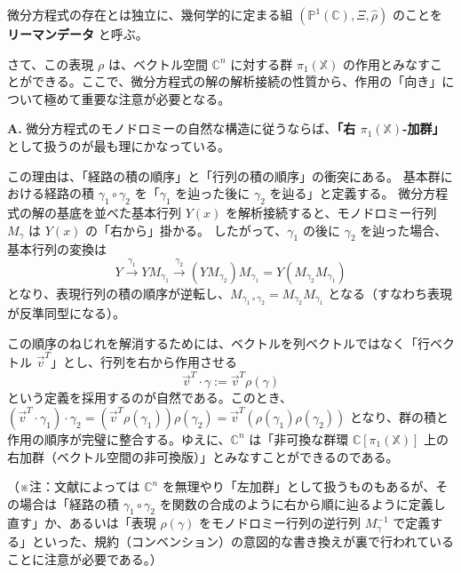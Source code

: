 \begin{definition}[リーマンデータの純粋化]
    微分方程式の存在とは独立に、幾何学的に定まる組 $(\mathbb{P}^{1}(\mathbb{C}),\Xi,\hat{\rho})$ のことを \textbf{リーマンデータ} と呼ぶ。
\end{definition}

さて、この表現 $\rho$ は、ベクトル空間 $\mathbb{C}^n$ に対する群 $\pi_1(\mathbb{X})$ の作用とみなすことができる。ここで、微分方程式の解の解析接続の性質から、作用の「向き」について極めて重要な注意が必要となる。

\begin{Q}
\textbf{A.} 微分方程式のモノドロミーの自然な構造に従うならば、\textbf{「右 $\pi_1(\mathbb{X})$-加群」}として扱うのが最も理にかなっている。

この理由は、「経路の積の順序」と「行列の積の順序」の衝突にある。
基本群における経路の積 $\gamma_1 \circ \gamma_2$ を「$\gamma_1$ を辿った後に $\gamma_2$ を辿る」と定義する。
微分方程式の解の基底を並べた基本行列 $Y(x)$ を解析接続すると、モノドロミー行列 $M_\gamma$ は $Y(x)$ の「右から」掛かる。
したがって、$\gamma_1$ の後に $\gamma_2$ を辿った場合、基本行列の変換は
\[
Y \xrightarrow{\gamma_1} Y M_{\gamma_1} \xrightarrow{\gamma_2} (Y M_{\gamma_2}) M_{\gamma_1} = Y (M_{\gamma_2} M_{\gamma_1})
\]
となり、表現行列の積の順序が逆転し、$M_{\gamma_1 \circ \gamma_2} = M_{\gamma_2} M_{\gamma_1}$ となる（すなわち表現が反準同型になる）。

この順序のねじれを解消するためには、ベクトルを列ベクトルではなく「行ベクトル $\vec{v}^T$」とし、行列を右から作用させる
\[
\vec{v}^T \cdot \gamma := \vec{v}^T \rho(\gamma)
\]
という定義を採用するのが自然である。このとき、$(\vec{v}^T \cdot \gamma_1) \cdot \gamma_2 = (\vec{v}^T \rho(\gamma_1)) \rho(\gamma_2) = \vec{v}^T (\rho(\gamma_1)\rho(\gamma_2))$ となり、群の積と作用の順序が完璧に整合する。ゆえに、$\mathbb{C}^n$ は「非可換な群環 $\mathbb{C}[\pi_1(\mathbb{X})]$ 上の右加群（ベクトル空間の非可換版）」とみなすことができるのである。

（※注：文献によっては $\mathbb{C}^n$ を無理やり「左加群」として扱うものもあるが、その場合は「経路の積 $\gamma_1 \circ \gamma_2$ を関数の合成のように右から順に辿るように定義し直す」か、あるいは「表現 $\rho(\gamma)$ をモノドロミー行列の逆行列 $M_\gamma^{-1}$ で定義する」といった、規約（コンベンション）の意図的な書き換えが裏で行われていることに注意が必要である。）
\end{Q}

